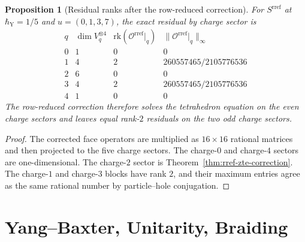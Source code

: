 \documentclass[11pt]{amsart}
\newtheorem{proposition}[theorem]{Proposition}
\theoremstyle{definition}
\theoremstyle{remark}
\newcommand{\rk}{\mathrm{rk}}
\begin{document}
\begin{proposition}[Residual ranks after the row-reduced correction]
\label{prop:charge-residuals}
For $S^{\mathrm{rref}}$ at
$\hbar_{\mathrm{Y}}=1/5$ and $u=(0,1,3,7)$, the exact residual by
charge sector is
\[
\begin{array}{c|c|c|c}
q & \dim V^{\otimes 4}_{q} & \rk(\mathcal O^{\mathrm{rref}}|_q)
  & \|\mathcal O^{\mathrm{rref}}|_q\|_\infty\\
\hline
0 & 1 & 0 & 0\\
1 & 4 & 2 & 260557465/2105776536\\
2 & 6 & 0 & 0\\
3 & 4 & 2 & 260557465/2105776536\\
4 & 1 & 0 & 0
\end{array}
\]
The row-reduced correction therefore solves the tetrahedron equation on
the even charge sectors and leaves equal rank-$2$ residuals on the two
odd charge sectors.
\end{proposition}

\begin{proof}
The corrected face operators are multiplied as $16\times 16$ rational
matrices and then projected to the five charge sectors.  The charge-$0$
and charge-$4$ sectors are one-dimensional.  The charge-$2$ sector is
Theorem~\ref{thm:rref-zte-correction}.  The charge-$1$ and charge-$3$
blocks have rank $2$, and their maximum entries agree as the same
rational number by particle--hole conjugation.
\end{proof}

\section{Yang--Baxter, Unitarity, Braiding}
\end{document}
